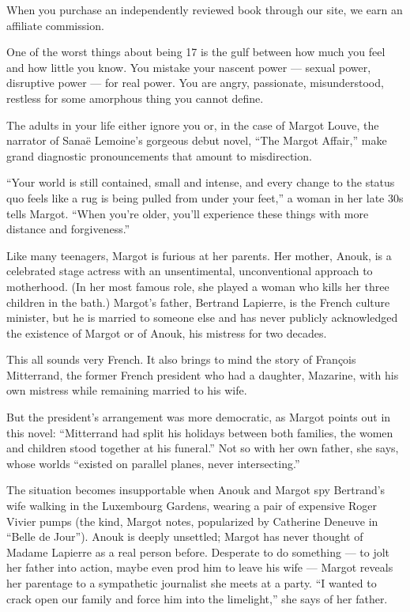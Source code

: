 When you purchase an independently reviewed book through our site, we
earn an affiliate commission.

One of the worst things about being 17 is the gulf between how much you
feel and how little you know. You mistake your nascent power --- sexual
power, disruptive power --- for real power. You are angry, passionate,
misunderstood, restless for some amorphous thing you cannot define.

The adults in your life either ignore you or, in the case of Margot
Louve, the narrator of Sanaë Lemoine's gorgeous debut novel, ``The
Margot Affair,'' make grand diagnostic pronouncements that amount to
misdirection.

``Your world is still contained, small and intense, and every change to
the status quo feels like a rug is being pulled from under your feet,''
a woman in her late 30s tells Margot. ``When you're older, you'll
experience these things with more distance and forgiveness.''

Like many teenagers, Margot is furious at her parents. Her mother,
Anouk, is a celebrated stage actress with an unsentimental,
unconventional approach to motherhood. (In her most famous role, she
played a woman who kills her three children in the bath.) Margot's
father, Bertrand Lapierre, is the French culture minister, but he is
married to someone else and has never publicly acknowledged the
existence of Margot or of Anouk, his mistress for two decades.

This all sounds very French. It also brings to mind the story of
François Mitterrand, the former French president who had a daughter,
Mazarine, with his own mistress while remaining married to his wife.

But the president's arrangement was more democratic, as Margot points
out in this novel: ``Mitterrand had split his holidays between both
families, the women and children stood together at his funeral.'' Not so
with her own father, she says, whose worlds ``existed on parallel
planes, never intersecting.''

The situation becomes insupportable when Anouk and Margot spy Bertrand's
wife walking in the Luxembourg Gardens, wearing a pair of expensive
Roger Vivier pumps (the kind, Margot notes, popularized by Catherine
Deneuve in ``Belle de Jour''). Anouk is deeply unsettled; Margot has
never thought of Madame Lapierre as a real person before. Desperate to
do something --- to jolt her father into action, maybe even prod him to
leave his wife --- Margot reveals her parentage to a sympathetic
journalist she meets at a party. ``I wanted to crack open our family and
force him into the limelight,'' she says of her father.

